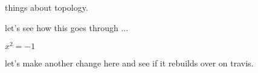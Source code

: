 things about topology.

let's see how this goes through ...

$x^2 = -1$

let's make another change here and see if it rebuilds over on travis.
